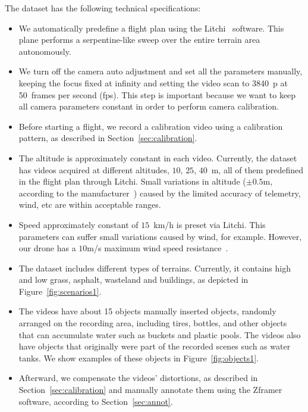 The dataset has the following technical specifications:
%
\begin{itemize}
  \item We automatically predefine a flight plan using the Litchi~\cite{web:litchi} software.
  This plane performs a serpentine-like sweep over the entire terrain area autonomously.
%
  \item We turn off the camera auto adjustment and set all the parameters manually,
  keeping the focus fixed at infinity and
  setting the video scan to 3840~p at 50~frames per second (fps).
  This step is important because we want to keep all camera parameters constant in order to perform camera calibration.
%
  \item Before starting a flight, we record a calibration video using a calibration pattern, as described in Section~\ref{sec:calibration}.
%
  \item The altitude is approximately constant in each video.
  Currently, the dataset has videos acquired at different altitudes, \eg $10$, $25$, $40$~m, all of them predefined in the flight plan through Litchi.
  Small variations in altitude ($\pm 0.5$m, according to the manufacturer~\cite{web:djip4prospec}) caused by the limited accuracy of telemetry, wind, etc are within acceptable ranges.
%
  \item Speed approximately constant of $15$~km/h is preset via Litchi.
  This parameters can suffer small variations caused by wind, for example.
  However, our drone has a $10$m/s maximum wind speed resistance~\cite{web:djip4prospec}.
%
  \item The dataset includes different types of terrains.
  Currently, it contains high and low grass, asphalt, wasteland and buildings, as depicted in Figure~\ref{fig:scenarios1}.
%
  \item The videos have about 15 objects manually inserted objects, randomly arranged on the recording area, including tires, bottles, and other objects that can accumulate water such as buckets and plastic pools.
  The videos also have objects that originally were part of the recorded scenes such as water tanks.
  We show examples of these objects in Figure~\ref{fig:objects1}.
%
  \item Afterward, we compensate the videos' distortions, as described in Section~\ref{sec:calibration} and manually annotate them using the Zframer software, according to Section~\ref{sec:annot}.
%
\end{itemize}

